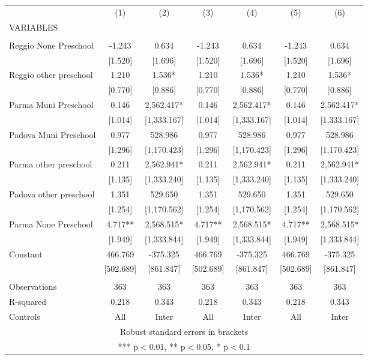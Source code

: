 \begin{tabular}{lcccccc} \hline
 & (1) & (2) & (3) & (4) & (5) & (6) \\
VARIABLES &  &  &  &  &  &  \\ \hline
 &  &  &  &  &  &  \\
Reggio None Preschool & -1.243 & 0.634 & -1.243 & 0.634 & -1.243 & 0.634 \\
 & [1.520] & [1.696] & [1.520] & [1.696] & [1.520] & [1.696] \\
Reggio other preschool & 1.210 & 1.536* & 1.210 & 1.536* & 1.210 & 1.536* \\
 & [0.770] & [0.886] & [0.770] & [0.886] & [0.770] & [0.886] \\
Parma Muni Preschool & 0.146 & 2,562.417* & 0.146 & 2,562.417* & 0.146 & 2,562.417* \\
 & [1.014] & [1,333.167] & [1.014] & [1,333.167] & [1.014] & [1,333.167] \\
Padova Muni Preschool & 0.977 & 528.986 & 0.977 & 528.986 & 0.977 & 528.986 \\
 & [1.296] & [1,170.423] & [1.296] & [1,170.423] & [1.296] & [1,170.423] \\
Parma other preschool & 0.211 & 2,562.941* & 0.211 & 2,562.941* & 0.211 & 2,562.941* \\
 & [1.135] & [1,333.240] & [1.135] & [1,333.240] & [1.135] & [1,333.240] \\
Padova other preschool & 1.351 & 529.650 & 1.351 & 529.650 & 1.351 & 529.650 \\
 & [1.254] & [1,170.562] & [1.254] & [1,170.562] & [1.254] & [1,170.562] \\
Parma None Preschool & 4.717** & 2,568.515* & 4.717** & 2,568.515* & 4.717** & 2,568.515* \\
 & [1.949] & [1,333.844] & [1.949] & [1,333.844] & [1.949] & [1,333.844] \\
Constant & 466.769 & -375.325 & 466.769 & -375.325 & 466.769 & -375.325 \\
 & [502.689] & [861.847] & [502.689] & [861.847] & [502.689] & [861.847] \\
 &  &  &  &  &  &  \\
Observations & 363 & 363 & 363 & 363 & 363 & 363 \\
R-squared & 0.218 & 0.343 & 0.218 & 0.343 & 0.218 & 0.343 \\
 Controls & All & Inter & All & Inter & All & Inter \\ \hline
\multicolumn{7}{c}{ Robust standard errors in brackets} \\
\multicolumn{7}{c}{ *** p$<$0.01, ** p$<$0.05, * p$<$0.1} \\
\end{tabular}

